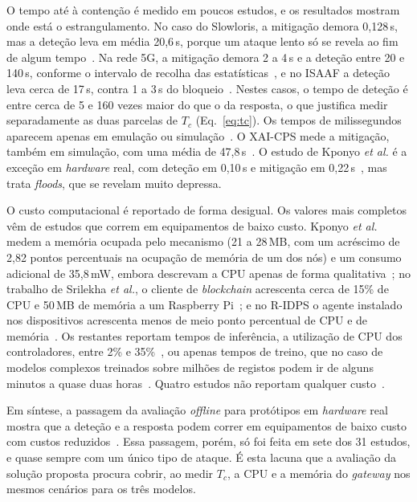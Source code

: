 \documentclass[conference,a4paper]{IEEEtran}
\begin{document}
O tempo até à contenção é medido em poucos estudos, e os resultados mostram onde está o
estrangulamento. No caso do Slowloris, a mitigação demora 0,128\,s, mas a deteção leva em
média 20,6\,s, porque um ataque lento só se revela ao fim de algum
tempo~\cite{ramirezmartinez2025p4}. Na rede 5G, a mitigação demora 2 a 4\,s e a deteção
entre 20 e 140\,s, conforme o intervalo de recolha das
estatísticas~\cite{andrade2024ddos}, e no ISAAF a deteção leva cerca de 17\,s, contra 1
a 3\,s do bloqueio~\cite{karam2025isaaf}. Nestes casos, o tempo de deteção é entre cerca de
5 e 160 vezes maior do que o da resposta, o que justifica medir separadamente as duas
parcelas de $T_c$ (Eq.~\ref{eq:tc}). Os tempos de milissegundos aparecem apenas em
emulação ou simulação~\cite{toony2024multiblock,shukla2026cyber}. O XAI-CPS mede a
mitigação, também em simulação, com uma média de 47,8\,s~\cite{Rasheed2026}. O estudo de
Kponyo \textit{et al.} é a exceção em \textit{hardware} real, com deteção em 0,10\,s e mitigação em
0,22\,s~\cite{kponyo2020lightweight}, mas trata \textit{floods}, que se revelam muito
depressa.

O custo computacional é reportado de forma desigual. Os valores mais completos vêm de
estudos que correm em equipamentos de baixo custo. Kponyo \textit{et al.} medem a memória
ocupada pelo mecanismo (21 a 28\,MB, com um acréscimo de 2,82 pontos percentuais na
ocupação de memória de um dos nós) e um consumo adicional de 35,8\,mW, embora descrevam a
CPU apenas de forma qualitativa~\cite{kponyo2020lightweight}; no trabalho de Srilekha
\textit{et al.}, o cliente de \textit{blockchain} acrescenta cerca de 15\% de CPU e 50\,MB
de memória a um Raspberry Pi~\cite{srilekha2025hybrid}; e no R-IDPS o agente instalado nos
dispositivos acrescenta menos de meio ponto percentual de CPU e de
memória~\cite{mazhar2022ridps}. Os restantes reportam tempos de inferência, a utilização
de CPU dos controladores, entre 2\% e 35\%~\cite{andrade2024ddos,elsayed2024mpguard}, ou
apenas tempos de treino, que no caso de modelos complexos treinados sobre milhões de
registos podem ir de alguns minutos a quase duas horas~\cite{garba2024sdn}. Quatro estudos
não reportam qualquer
custo~\cite{zolotukhin2021curious,tawfik2021internet,rawat2024intelligent,tariq2025saegru}.

Em síntese, a passagem da avaliação \textit{offline} para protótipos em \textit{hardware}
real mostra que a deteção e a resposta podem correr em equipamentos de baixo custo com
custos reduzidos~\cite{kponyo2020lightweight,srilekha2025hybrid,Iqbal2026}. Essa passagem,
porém, só foi feita em sete dos 31 estudos, e quase sempre com um único tipo de ataque.
É esta lacuna que a avaliação da solução proposta procura cobrir, ao medir $T_c$, a CPU e
a memória do \textit{gateway} nos mesmos cenários para os três modelos.
\end{document}
